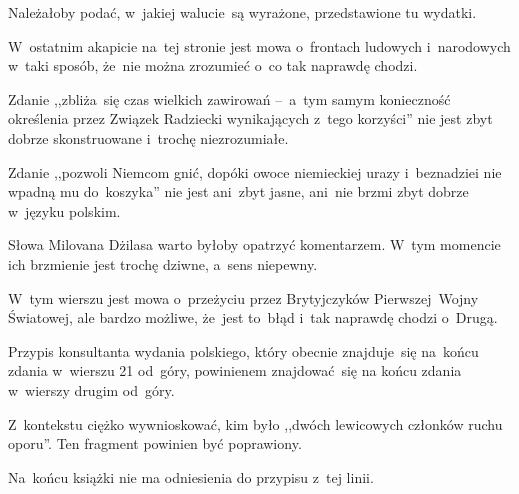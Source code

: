 \documentclass[a4paper,11pt]{article}
\begin{document}
\vspace{\spaceFour}


\start {} Należałoby podać, w~jakiej walucie~są wyrażone,
przedstawione tu wydatki.

\vspace{\spaceFour}


\start {} W~ostatnim akapicie na~tej stronie jest mowa
o~frontach ludowych i~narodowych w~taki sposób, że~nie można zrozumieć
o~co tak naprawdę chodzi.

\vspace{\spaceFour}


\start {} Zdanie ,,zbliża~się czas wielkich zawirowań
--~a~tym samym konieczność określenia przez Związek Radziecki
wynikających z~tego korzyści'' nie jest zbyt dobrze skonstruowane
i~trochę niezrozumiałe.

\vspace{\spaceFour}


\start {} Zdanie ,,pozwoli Niemcom gnić, dopóki owoce
niemieckiej urazy i~beznadziei nie wpadną mu do~koszyka'' nie jest
ani~zbyt jasne, ani~nie brzmi zbyt dobrze w~języku polskim.

\vspace{\spaceFour}


\start {} Słowa Milovana Dżilasa warto byłoby opatrzyć
komentarzem. W~tym momencie ich brzmienie jest trochę dziwne, a~sens
niepewny.

\vspace{\spaceFour}


\start {} W~tym wierszu jest mowa o~przeżyciu przez
Brytyjczyków Pierwszej~Wojny Światowej, ale bardzo możliwe, że~jest
to~błąd i~tak naprawdę chodzi o~Drugą.

\vspace{\spaceFour}


\start {} Przypis konsultanta wydania polskiego, który obecnie
znajduje~się na~końcu zdania w~wierszu 21 od~góry, powinienem
znajdować~się na końcu zdania w~wierszy drugim od~góry.

\vspace{\spaceFour}


\start {} Z~kontekstu ciężko wywnioskować, kim było
,,dwóch lewicowych członków ruchu oporu''. Ten fragment powinien być
poprawiony.

\vspace{\spaceFour}


\start {} Na~końcu książki nie ma odniesienia do przypisu
z~tej linii.
\end{document}
